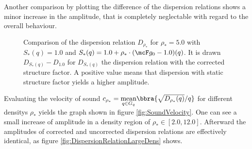 Another comparison by plotting the difference of the dispersion relations shows a minor increase in the amplitude, that is completely neglectable with regard to the overall behaviour.
\begin{figure}[H]
    \centering
    \caption{Comparison of the dispersion relation $D_{\rho_*}$ for $\rho_* = 5.0$ with $S_*(q) = 1.0$ and $S_*(q) = 1.0 + \rho_*\cdot(\mcF g_0 - 1.0)(q)$. It is drawn $D_{S_*(q)} - D_{1.0}$ for $D_{S_*(q)}$ the dispersion relation with the corrected structure factor. A positive value means that dispersion with static structure factor yields a higher amplitude.}
    \label{fig:DispersionRelationComparison}
\end{figure}
Evaluating the velocity of sound $c_{\rho_*} = \underset{q\in G_q}{\text{mean}}\bbra{\sqrt{D_{\rho_*}(q)}/q}$ for different densitys $\rho_*$ yields the graph shown in figure \ref{fig:SoundVelocity}. One can see a small increase of amplitude in a density region of $\rho_*\in[2.0,12.0]$. Afterward the amplitudes of corrected and uncorrected dispersion relations are effectively identical, as figure \ref{fig:DispersionRelationLargeDens} shows.
